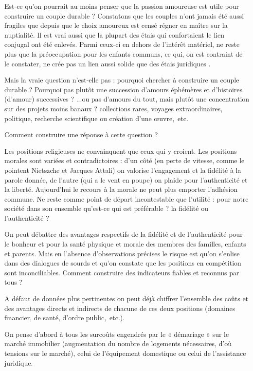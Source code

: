  Est-ce qu'on pourrait au moins penser que la passion amoureuse est utile pour construire un couple durable ? Constatons que les couples n'ont jamais été aussi fragiles que depuis que le choix amoureux est censé régner en maître sur la nuptialité. Il est vrai aussi que la plupart des étais qui confortaient le lien conjugal ont été enlevés. Parmi ceux-ci en dehors de l'intérêt matériel, ne reste plus que la préoccupation pour les enfants communs, ce qui, on est contraint de le constater,  ne crée pas un lien aussi solide que des étais juridiques .
 
 Mais la vraie question n'est-elle pas : pourquoi chercher à construire un couple durable ? Pourquoi pas plutôt une succession d'amours éphémères et d'histoires (d'amour) successives ?  
 ...ou pas d'amours du tout, mais plutôt une concentration sur des projets moins banaux ? collections rares, voyages extraordinaires, politique, recherche scientifique ou création d'une œuvre,~etc.
 
Comment construire une réponse à cette question ?

Les positions religieuses ne convainquent que ceux qui y croient. Les positions morales sont variées et contradictoires : d'un côté (en perte de vitesse, comme le pointent Nietszche et Jacques Attali) on valorise l'engagement et la fidélité à la parole donnée, de l'autre (qui a le vent en poupe) on plaide pour l'authenticité et la liberté. Aujourd'hui le recours à la morale ne peut plus emporter l'adhésion commune. Ne reste comme point de départ incontestable que l'utilité : pour notre société dans son ensemble qu'est-ce qui est préférable ? la fidélité ou l'authenticité ?

On peut débattre des avantages respectifs de la fidélité et de l'authenticité pour le bonheur et pour la santé physique et morale des membres des familles, enfants et parents. Mais en l'absence d'observations précises le risque est qu'on s'enlise dans des dialogues de sourds et qu'on constate que les positions en compétition sont inconciliables. Comment construire des indicateurs fiables et reconnus par tous ? 

A défaut de données plus pertinentes on peut déjà chiffrer l'ensemble des coûts et des avantages directs et indirects de chacune de ces deux positions (domaines financier, de santé, d'ordre public,~etc.). 

On pense d'abord à tous les surcoûts engendrés par le « démariage » sur le marché immobilier (augmentation du nombre de logements nécessaires, d'où tensions sur le marché), celui de l'équipement domestique ou celui de l'assistance juridique. 

